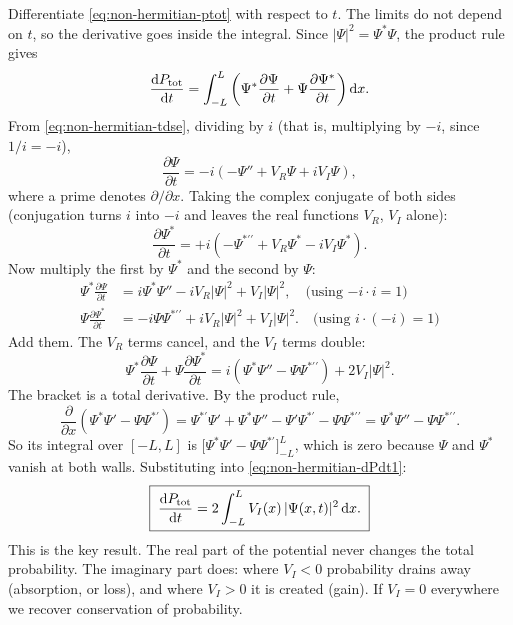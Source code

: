 Differentiate \eqref{eq:non-hermitian-ptot} with respect to $t$. The limits do not depend on $t$, so the derivative goes inside the integral. Since $|\Psi|^2 = \Psi^*\Psi$, the product rule gives
\begin{equation}
\frac{\mathrm{d} P_{\rm tot}}{\mathrm{d} t} = \int_{-L}^{L}\left(\Psi^*\frac{\partial\Psi}{\partial t} + \Psi\frac{\partial\Psi^*}{\partial t}\right)\mathrm{d} x .
\label{eq:non-hermitian-dPdt1}
\end{equation}
From \eqref{eq:non-hermitian-tdse}, dividing by $i$ (that is, multiplying by $-i$, since $1/i=-i$),
\begin{equation}
\frac{\partial\Psi}{\partial t} = -i\left(-\Psi'' + V_R\Psi + iV_I\Psi\right),
\end{equation}
where a prime denotes $\partial/\partial x$. Taking the complex conjugate of both sides (conjugation turns $i$ into $-i$ and leaves the real functions $V_R$, $V_I$ alone):
\begin{equation}
\frac{\partial\Psi^*}{\partial t} = +i\left(-\Psi^{*\prime\prime} + V_R\Psi^* - iV_I\Psi^*\right).
\end{equation}
Now multiply the first by $\Psi^*$ and the second by $\Psi$:
\begin{align}
\Psi^*\frac{\partial\Psi}{\partial t} &= i\Psi^*\Psi'' - iV_R|\Psi|^2 + V_I|\Psi|^2,
\quad\text{(using $-i\cdot i = 1$)}\\
\Psi\frac{\partial\Psi^*}{\partial t} &= -i\Psi\Psi^{*\prime\prime} + iV_R|\Psi|^2 + V_I|\Psi|^2.
\quad\text{(using $i\cdot(-i) = 1$)}
\end{align}
Add them. The $V_R$ terms cancel, and the $V_I$ terms double:
\begin{equation}
\Psi^*\frac{\partial\Psi}{\partial t} + \Psi\frac{\partial\Psi^*}{\partial t}
= i\left(\Psi^*\Psi'' - \Psi\Psi^{*\prime\prime}\right) + 2V_I|\Psi|^2 .
\end{equation}
The bracket is a total derivative. By the product rule,
\begin{equation}
\frac{\partial}{\partial x}\left(\Psi^*\Psi' - \Psi\Psi^{*\prime}\right)
= \Psi^{*\prime}\Psi' + \Psi^*\Psi'' - \Psi'\Psi^{*\prime} - \Psi\Psi^{*\prime\prime}
= \Psi^*\Psi'' - \Psi\Psi^{*\prime\prime}.
\end{equation}
So its integral over $[-L,L]$ is $\bigl[\Psi^*\Psi' - \Psi\Psi^{*\prime}\bigr]_{-L}^{L}$, which is zero because $\Psi$ and $\Psi^*$ vanish at both walls. Substituting into \eqref{eq:non-hermitian-dPdt1}:
\begin{equation}
\boxed{\;\frac{\mathrm{d} P_{\rm tot}}{\mathrm{d} t} = 2\int_{-L}^{L} V_I(x)\,|\Psi(x,t)|^2\,\mathrm{d} x.\;}
\label{eq:non-hermitian-dPdt}
\end{equation}
This is the key result. The real part of the potential never changes the total probability. The imaginary part does: where $V_I<0$ probability drains away (absorption, or loss), and where $V_I>0$ it is created (gain). If $V_I=0$ everywhere we recover conservation of probability.

